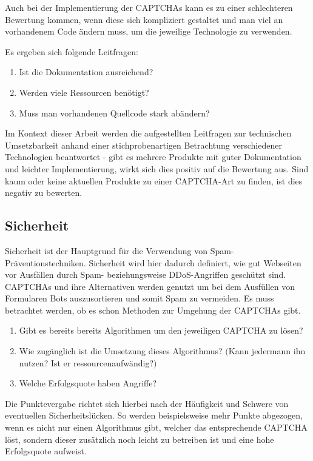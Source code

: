 Auch bei der Implementierung der CAPTCHAs kann es zu einer schlechteren Bewertung kommen, wenn diese sich kompliziert gestaltet und man viel an vorhandenem Code ändern muss,
um die jeweilige Technologie zu verwenden.

Es ergeben sich folgende Leitfragen:
\begin{enumerate}
    \item Ist die Dokumentation ausreichend? 
    \item Werden viele Ressourcen benötigt?
    \item Muss man vorhandenen Quellcode stark abändern?
\end{enumerate}

Im Kontext dieser Arbeit werden die aufgestellten Leitfragen zur technischen Umsetzbarkeit anhand einer stichprobenartigen Betrachtung verschiedener 
Technologien beantwortet - gibt es mehrere Produkte mit guter Dokumentation und leichter Implementierung,
wirkt sich dies positiv auf die Bewertung aus.
Sind kaum oder keine aktuellen Produkte zu einer CAPTCHA-Art zu finden, ist dies negativ zu bewerten.
 
\subsection{Sicherheit}
\label{ch:matrix:aspekte:sicherheit}
Sicherheit ist der Hauptgrund für die Verwendung von Spam-Präventions\-techniken.
Sicherheit wird hier dadurch definiert, wie gut Webseiten vor Ausfällen durch Spam- beziehungsweise DDoS-Angriffen geschützt sind.
CAPTCHAs und ihre Alternativen werden genutzt um bei dem Ausfüllen von Formularen Bots auszusortieren und somit Spam zu vermeiden.
Es muss betrachtet werden, ob es schon Methoden zur Umgehung der CAPTCHAs gibt.
\begin{enumerate}
    \item Gibt es bereits bereits Algorithmen um den jeweiligen CAPTCHA zu lösen?
    \item Wie zugänglich ist die Umsetzung dieses Algorithmus? $($Kann jedermann ihn nutzen? Ist er ressourcenaufwändig?$)$
    \item Welche Erfolgsquote haben Angriffe?
\end{enumerate}

Die Punktevergabe richtet sich hierbei nach der Häufigkeit und Schwere von eventuellen Sicherheitslücken.
So werden beispielsweise mehr Punkte abgezogen, wenn es nicht nur einen Algorithmus gibt, welcher das entsprechende CAPTCHA löst,
sondern dieser zusätzlich noch leicht zu betreiben ist und eine hohe Erfolgsquote aufweist.

